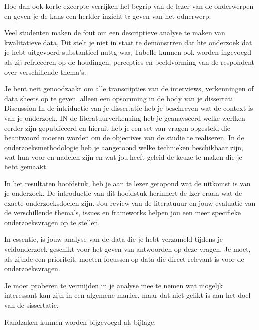 Hoe dan ook korte excerpte verrijken het begrip van de lezer van de onderwerpen en geven je de kans een herlder inzicht te geven van het odnerwerp.

Veel studenten maken de fout om een descriptieve analyse te maken van kwalitatieve data, Dit stelt je niet in staat te demonstrren dat hte onderzoek dat je hebt uitgevoerd substantieel nuttg was, Tabelle kunnen ook worden ingevoegd als zij refrleceren op de houdingen, percepties en beeldvorming van de respondent over verschillende thema's.



Je bent neit genoodzaakt om alle transcripties van de interviews, verkenningen of data sheets op te geven.  alleen een opsomming in de body van  je dissertati
Discussion
In de intriductie van je dissertatie heb je beschreven wat de context is van je onderzoek. IN de literatuurverkenning heb je geanayseerd welke werlken eerder zijn gepubliceerd en hieruit heb je een set van vragen opgesteld die beantwoord moeten worden om de objectives van de studie te realiseren. In de onderzoeksmethodologie heb je aangetoond welke technieken beschikbaar zijn, wat hun voor en nadelen zijn  en wat jou heeft geleid de keuze te maken die je hebt gemaakt.


In het resultaten hoofdstuk, heb je aan te lezer getopond wat de uitkomst is van je onderzoek. De introductie van dit hoofdstuk herinnert de lzer eraan wat de exacte onderzoeksdoelen zijn. Jou review van de literatuuur en jouw evaluatie van de verschillende thema's, issues en frameworks helpen jou  een meer specifieke onderzoeksvragen op te stellen.

In essentie, is jouw analyse van de data die je hebt verzameld tijdens je veldonderzoek geschikt voor het geven van antwoorden op deze vragen. Je moet, als zijnde een prioriteit,   moeten focussen op data die direct relevant is voor de onderzoeksvragen.

Je moet proberen te vermijden in je analyse mee te nemen wat mogeljk interessant kan zijn in een algemene manier, maar dat niet gelikt is aan het doel van de sissertatie.

Randzaken kunnen worden bijgevoegd als bijlage.





